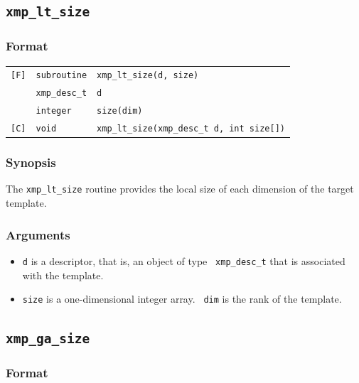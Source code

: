 \subsection{\tt xmp\_lt\_size}

\subsubsection*{Format}

\begin{tabular}{lll}

\verb![F]!& {\tt subroutine}& {\tt xmp\_lt\_size(d, size)}\\
          & {\tt xmp\_desc\_t} & {\tt d}\\
          & {\tt integer} & {\tt size(dim)}\\

\verb![C]!&  {\tt void}& {\tt xmp\_lt\_size(xmp\_desc\_t d, int size[])}\\

\end{tabular}

\subsubsection*{Synopsis}

The {\tt xmp\_lt\_size} routine provides the local size of each dimension
of the target template.

\subsubsection*{Arguments}

\begin{itemize}
 \item {\tt d} is a descriptor, that is, an object of type {\tt
       xmp\_desc\_t} that is associated with the template.
 \item {\tt size} is a one-dimensional integer array. {\tt
       dim} is the rank of the template.
\end{itemize}


\subsection{\tt xmp\_ga\_size}

\subsubsection*{Format}

